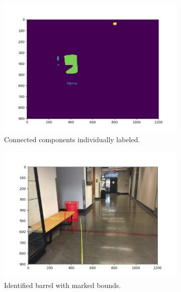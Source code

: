 \documentclass[a4paper]{article}
\begin{document}
\begin{figure}[!tbp]
  \centering
  \begin{subfigure}[b]{.4\textwidth}
    \includegraphics[width=1.3\textwidth]{labeled_image.png}
\caption{\label{fig:labeled_image}Connected components individually labeled.}
  \end{subfigure}
  \begin{subfigure}[b]{.4\textwidth}
    \includegraphics[width=1.3\textwidth]{drawn_barrel.png}
\caption{\label{fig:ident_image}Identified barrel with marked bounds.}
  \end{subfigure}
  \caption{\label{fig:third_set}}
\end{figure}
\end{document}

